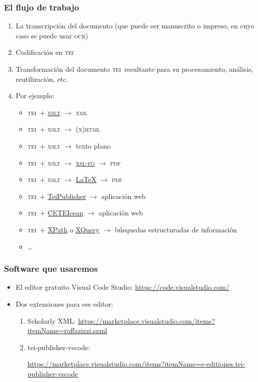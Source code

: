 \documentclass[%
  handout, %
  ]{beamer}
\newcommand*{\TEI}{\textsc{tei}}
\newcommand*{\XML}{\textsc{xml}}
\begin{document}
\begin{frame}
  \frametitle{El flujo de trabajo}
  \begin{enumerate}
    \item La transcripción del documento (que puede ser manuscrito o impreso, en cuyo caso se puede usar \textsc{ocr})
    \item Codificación en \TEI
    \item Transformación del documento \TEI\ resultante para su procesamiento, análisis, reutilización, etc. 
    \item[] Por ejemplo:
      \begin{itemize}
        \item \TEI\ $+$ \href{https://www.w3.org/TR/xslt/}{\textsc{xslt}} $\rightarrow$ \XML
        \item \TEI\ $+$ \textsc{xslt} $\rightarrow$ \textsc{(x)html}
        \item \TEI\ $+$ \textsc{xslt} $\rightarrow$ texto plano
        \item \TEI\ $+$ \textsc{xslt} $\rightarrow$ \href{https://www.w3.org/TR/xsl11/\#fo-section}{\textsc{xsl-fo}}  $\rightarrow$ \textsc{pdf}
        \item \TEI\ $+$ \textsc{xslt} $\rightarrow$ \href{https://www.latex-project.org/}{\LaTeX}  $\rightarrow$ \textsc{pdf}
        \item \TEI\ $+$ \href{https://teipublisher.com}{TeiPublisher} $\rightarrow$ aplicación web
        \item \TEI\ $+$ \href{https://github.com/TEIC/CETEIcean}{CETEIcean} $\rightarrow$ aplicación web
        \item \TEI\ $+$ \href{https://www.w3.org/TR/xpath-31/}{XPath} o \href{http://www.w3.org/XML/Query/}{XQuery} $\rightarrow$ búsquedas estructuradas de información 
        \item \dots
      \end{itemize}
  \end{enumerate}
\end{frame}

\begin{frame}
  \frametitle{Software que usaremos}
  \begin{itemize}
    \item El editor gratuito Visual Code Studio: \url{https://code.visualstudio.com/}
    \item Dos extensiones para ese editor:
      \begin{enumerate}
        \item Scholarly XML: \url{https://marketplace.visualstudio.com/items?itemName=raffazizzi.sxml}
        \item tei-publisher-vscode:

          \url{https://marketplace.visualstudio.com/items?itemName=e-editiones.tei-publisher-vscode}
      \end{enumerate}
  \end{itemize}
\end{frame}
\end{document}
